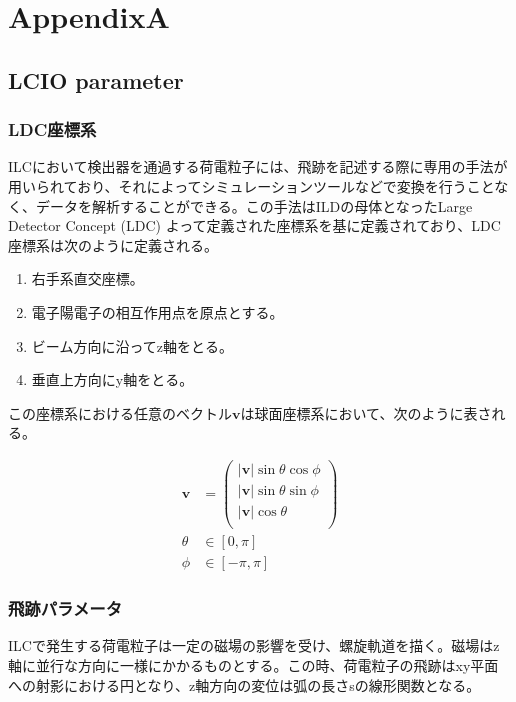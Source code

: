 
\appendix 

\chapter{AppendixA} \label{sec:Appendix}
\section{LCIO parameter}
\subsection{LDC座標系}
ILCにおいて検出器を通過する荷電粒子には、飛跡を記述する際に専用の手法が用いられており、それによってシミュレーションツールなどで変換を行うことなく、データを解析することができる。この手法はILDの母体となったLarge Detector Concept (LDC) よって定義された座標系\cite{ldc}を基に定義されており、LDC座標系は次のように定義される。
\begin{enumerate}
\item 右手系直交座標。
\item 電子陽電子の相互作用点を原点とする。
\item ビーム方向に沿ってz軸をとる。
\item 垂直上方向にy軸をとる。
\end{enumerate}

この座標系における任意のベクトル$\bm{v}$は球面座標系において、次のように表される。

\begin{align}
\mathbf{v} &= \left(
\begin{array}{c}
|\mathbf{v}| \sin \theta \cos \phi \\
|\mathbf{v}| \sin \theta \sin \phi \\
|\mathbf{v}| \cos \theta \\
\end{array}
\right) \\
\nonumber \theta& \in [0,\pi ] \\
\nonumber \phi &\in [-\pi , \pi ]
\end{align}

\subsection{飛跡パラメータ}
ILCで発生する荷電粒子は一定の磁場の影響を受け、螺旋軌道を描く。磁場はz軸に並行な方向に一様にかかるものとする。この時、荷電粒子の飛跡はxy平面への射影における円となり、z軸方向の変位は弧の長さsの線形関数となる。

